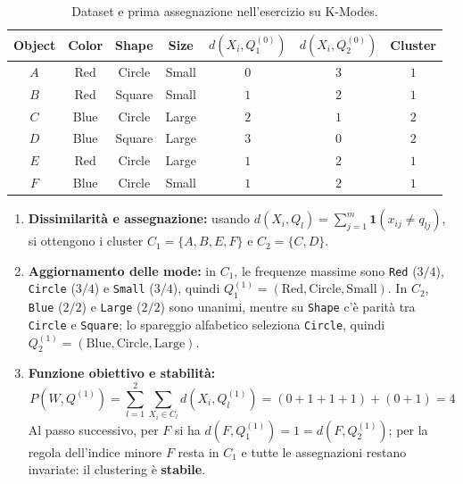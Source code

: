 \begin{table}[H]
\centering
\caption{Dataset e prima assegnazione nell'esercizio su K-Modes.}
\label{tab:dm-ex-kmodes}
\small
\begin{tabular}{ccccccc}
\toprule
\textbf{Object} & \textbf{Color} & \textbf{Shape} & \textbf{Size} & $d(X_i, Q_1^{(0)})$ & $d(X_i, Q_2^{(0)})$ & \textbf{Cluster} \\
\midrule
$A$ & Red  & Circle & Small & $0$ & $3$ & $1$ \\
$B$ & Red  & Square & Small & $1$ & $2$ & $1$ \\
$C$ & Blue & Circle & Large & $2$ & $1$ & $2$ \\
$D$ & Blue & Square & Large & $3$ & $0$ & $2$ \\
$E$ & Red  & Circle & Large & $1$ & $2$ & $1$ \\
$F$ & Blue & Circle & Small & $1$ & $2$ & $1$ \\
\bottomrule
\end{tabular}
\end{table}

\begin{enumerate}
    \item \textbf{Dissimilarit\`a e assegnazione:} usando $d(X_i, Q_l) = \sum_{j=1}^m \mathbf{1}(x_{ij} \neq q_{lj})$, si ottengono i cluster $C_1 = \{A, B, E, F\}$ e $C_2 = \{C, D\}$.
    \item \textbf{Aggiornamento delle mode:} in $C_1$, le frequenze massime sono \texttt{Red} ($3/4$), \texttt{Circle} ($3/4$) e \texttt{Small} ($3/4$), quindi $Q_1^{(1)} = (\text{Red}, \text{Circle}, \text{Small})$. In $C_2$, \texttt{Blue} ($2/2$) e \texttt{Large} ($2/2$) sono unanimi, mentre su \texttt{Shape} c'\`e parit\`a tra \texttt{Circle} e \texttt{Square}; lo spareggio alfabetico seleziona \texttt{Circle}, quindi $Q_2^{(1)} = (\text{Blue}, \text{Circle}, \text{Large})$.
    \item \textbf{Funzione obiettivo e stabilit\`a:}
    \begin{equation*}
        P(W, Q^{(1)}) = \sum_{l=1}^2 \sum_{X_i \in C_l} d(X_i, Q_l^{(1)}) = (0 + 1 + 1 + 1) + (0 + 1) = 4
    \end{equation*}
    Al passo successivo, per $F$ si ha $d(F, Q_1^{(1)}) = 1 = d(F, Q_2^{(1)})$; per la regola dell'indice minore $F$ resta in $C_1$ e tutte le assegnazioni restano invariate: il clustering \`e \textbf{stabile}.
\end{enumerate}

\FloatBarrier
